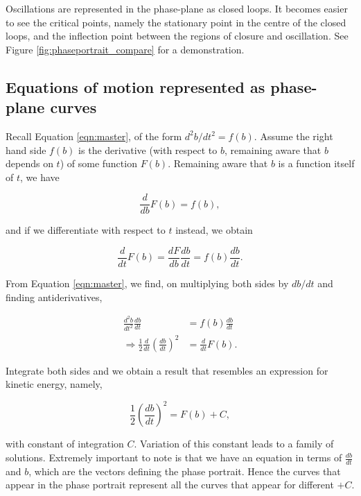 \documentclass{article}
\begin{document}
Oscillations are represented in the phase-plane as closed loops.
It becomes easier to see the critical points,
namely the stationary point in the centre of the closed loops,
and the inflection point between the regions of closure and oscillation.
See Figure \ref{fig:phaseportrait_compare} for a demonstration.

\subsection{Equations of motion represented as phase-plane curves}

Recall Equation \ref{eqn:master}, of the form $d^2b/dt^2 = f(b)$.
Assume the right hand side $f(b)$ is the derivative (with respect to $b$, remaining aware that $b$ depends on $t$) of some function $F(b)$.
Remaining aware that $b$ is a function itself of $t$, we have

\begin{equation}
    \frac{d}{db}F(b) = f(b),
\end{equation}

and if we differentiate with respect to $t$ instead, we obtain

\begin{equation}
    \frac{d}{dt}F(b) = \frac{dF}{db}\frac{db}{dt} = f(b)\frac{db}{dt}.
\end{equation}

From Equation \ref{eqn:master}, we find, on multiplying both sides by $db/dt$ and finding antiderivatives,

\begin{align}
    \frac{d^2b}{dt^2} \frac{db}{dt}                                   & = f(b) \frac{db}{dt} \\
    \Rightarrow \frac{1}{2}\frac{d}{dt}\left( \frac{db}{dt} \right)^2 & = \frac{d}{dt}F(b).
\end{align}

Integrate both sides and we obtain a result that resembles an expression for kinetic energy, namely,

\begin{equation}
    \frac{1}{2}\left(\frac{db}{dt}\right)^2 = F(b) + C,
    \label{eqn:integral_kinetic_energy}
\end{equation}

with constant of integration $C$. Variation of this constant leads to a family of solutions.
Extremely important to note is that we have an equation in terms of $\frac{db}{dt}$ and $b$, which are the vectors defining the phase portrait.
Hence the curves that appear in the phase portrait represent all the curves that appear for different $+C$.
\end{document}
